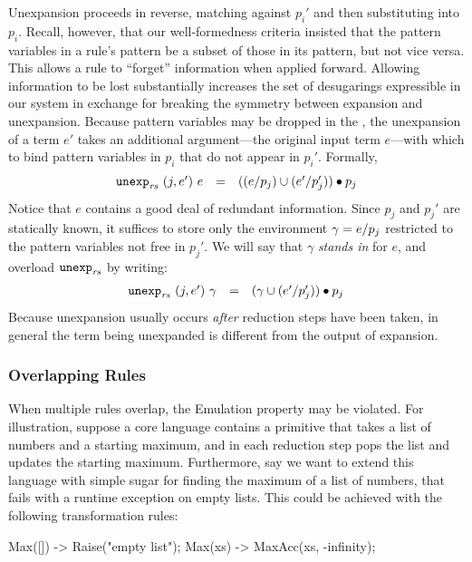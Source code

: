 Unexpansion proceeds in reverse, matching against $p_i'$ and then
substituting into $p_i$. Recall, however, that our well-formedness
criteria insisted that the pattern variables in a rule's  pattern be a
subset of those in its  pattern, but not vice versa. This allows a
rule to ``forget'' information when applied forward. Allowing information
to be lost substantially increases the set of desugarings expressible in
our system in exchange for breaking the symmetry between expansion and
unexpansion. Because pattern variables may be dropped in the , the
unexpansion of a term $e'$ takes an additional argument---the original
input term $e$---with which to bind pattern variables in $p_i$ that do not
appear in $p_i'$. Formally,
\[\begin{array}{lllll}
  \texttt{unexp}_{\mathit{rs}}\ {(j, e')}\ {e} &=&
    ((e / p_j) \cup (e' / p_j')) \bullet p_j
\end{array}\]
Notice that $e$ contains a good deal of redundant
information. Since $p_j$ and $p_j'$ are statically known, it
suffices to store only the environment $\gamma = e / p_j$
restricted to the pattern variables not free in $p_j'$. We will say that $\gamma$
\emph{stands in} for $e$, and overload $\texttt{unexp}_{\mathit{rs}}$ by writing:
\[\begin{array}{lllll}
  \texttt{unexp}_{\mathit{rs}}\ {(j, e')}\ {\gamma} &=&
    (\gamma \cup (e' / p_j')) \bullet p_j
\end{array}\]
Because unexpansion usually occurs \emph{after} reduction steps have
been taken, in general the term being unexpanded is different
from the output of expansion.


\subsubsection{Overlapping Rules}
\label{sec:reval-overlapping}

When multiple rules overlap, the Emulation property may be violated.
For illustration,
suppose a core language contains a  primitive
that takes a list of numbers and a starting maximum, and in each reduction
step pops the list and updates the starting maximum. Furthermore, say
we want to extend this language with simple sugar for finding the maximum
of a list of numbers, that fails with a runtime exception on empty
lists. This could be achieved with the following transformation rules:
\begin{Codes}
Max([]) -> Raise("empty list");
Max(xs) -> MaxAcc(xs, -infinity);
\end{Codes}

